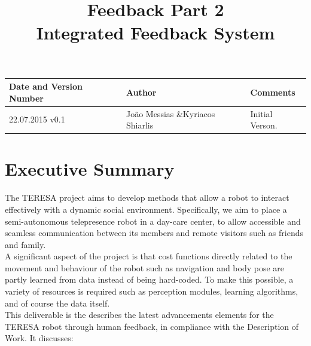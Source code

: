 \documentclass[a4paper,11pt]{report}
\title{Feedback Part 2\\ Integrated Feedback System}
\begin{document}
\maketitle
\makeheader


\begin{documentinfo}

\begin{tabular}{|p{5cm}|p{4cm}|p{5cm}|}
        \hline
        \rowcolor{gray!50}
        Date and Version Number & Author & Comments\\ \hline
        22.07.2015 v0.1 & Jo\~ao Messias \&\hfill Kyriacos Shiarlis & Initial Verson.\\ \hline
\end{tabular}

\end{documentinfo}


\pagebreak
\pagebreak

\tableofcontents

\pagebreak

\listoffigures

\pagebreak

\listoftables

\pagebreak




\section{Executive Summary}\label{sec:sum}

The TERESA project aims to develop methods that allow a robot to interact effectively with a dynamic social environment. Specifically, we aim to place a semi-autonomous telepresence robot in a day-care center, to allow accessible and seamless communication between its members and remote visitors such as friends and family.\\

 A significant aspect of the project is that cost functions directly related to the movement and behaviour of the robot such as navigation and body pose are partly learned from data instead of being hard-coded. To make this possible, a variety of resources is required such as perception modules, learning algorithms, and of course the data itself. \\

This deliverable is the describes the latest advancements 
elements for the TERESA robot through human feedback, in compliance with the 
Description of Work. It discusses:
\end{document}
